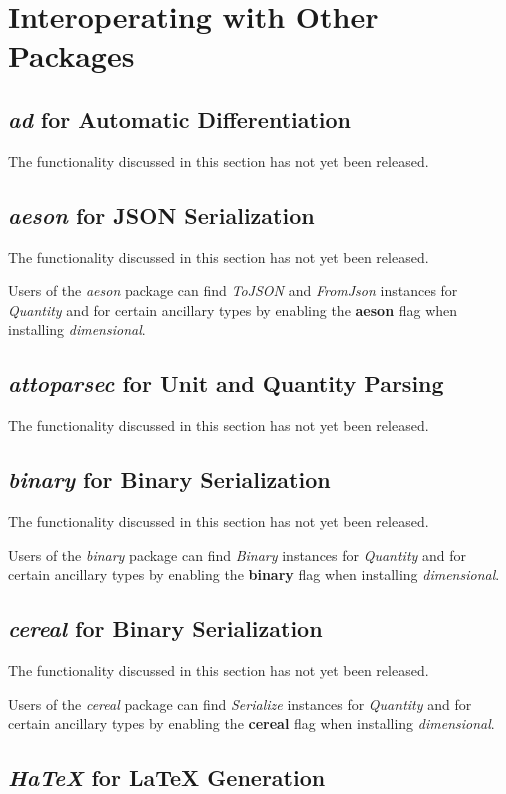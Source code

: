 \documentclass[11pt]{report}
\newcommand{\packagename}[1]{\textit{#1}}
\newcommand{\thispackage}{\packagename{dimensional}}
\newcommand{\classname}[1]{\textit{#1}}
\newcommand{\typename}[1]{\textit{#1}}
\newcommand{\flag}[1]{\textbf{#1}}
\newcommand{\prerelease}{\begin{framed}
The functionality discussed in this section has not yet been released.
\end{framed}}
\begin{document}
\chapter{Interoperating with Other Packages}

\section{\packagename{ad} for Automatic Differentiation}

\prerelease{}

\section{\packagename{aeson} for JSON Serialization}

\prerelease{}

Users of the \packagename{aeson} package can find \classname{ToJSON}
and \classname{FromJson} instances for \typename{Quantity} and for certain ancillary types by
enabling the \flag{aeson} flag when installing \thispackage{}.

\section{\packagename{attoparsec} for Unit and Quantity Parsing}

\prerelease{}

\section{\packagename{binary} for Binary Serialization}

\prerelease{}

Users of the \packagename{binary} package can find \classname{Binary}
instances for \typename{Quantity} and for certain ancillary types by
enabling the \flag{binary} flag when installing \thispackage{}.

\section{\packagename{cereal} for Binary Serialization}

\prerelease{}

Users of the \packagename{cereal} package can find \classname{Serialize}
instances for \typename{Quantity} and for certain ancillary types by
enabling the \flag{cereal} flag when installing \thispackage{}.

\section{\packagename{HaTeX} for \LaTeX{} Generation}
\end{document}
